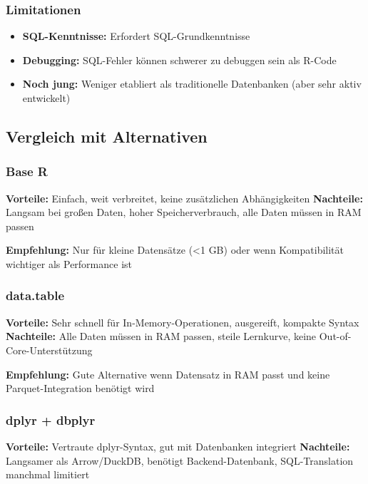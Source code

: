 \documentclass[
  ngerman,
  10pt,
  twocolumn]{article}
\providecommand{\tightlist}{%
  \setlength{\itemsep}{0pt}\setlength{\parskip}{0pt}}
\begin{document}
\subsubsection{Limitationen}\label{limitationen-1}

\begin{itemize}
\tightlist
\item
  \textbf{SQL-Kenntnisse:} Erfordert SQL-Grundkenntnisse
\item
  \textbf{Debugging:} SQL-Fehler können schwerer zu debuggen sein als
  R-Code
\item
  \textbf{Noch jung:} Weniger etabliert als traditionelle Datenbanken
  (aber sehr aktiv entwickelt)
\end{itemize}

\subsection{Vergleich mit
Alternativen}\label{vergleich-mit-alternativen}

\subsubsection{Base R}\label{base-r}

\textbf{Vorteile:} Einfach, weit verbreitet, keine zusätzlichen
Abhängigkeiten \textbf{Nachteile:} Langsam bei großen Daten, hoher
Speicherverbrauch, alle Daten müssen in RAM passen

\textbf{Empfehlung:} Nur für kleine Datensätze (\textless1 GB) oder wenn
Kompatibilität wichtiger als Performance ist

\subsubsection{data.table}\label{data.table}

\textbf{Vorteile:} Sehr schnell für In-Memory-Operationen, ausgereift,
kompakte Syntax \textbf{Nachteile:} Alle Daten müssen in RAM passen,
steile Lernkurve, keine Out-of-Core-Unterstützung

\textbf{Empfehlung:} Gute Alternative wenn Datensatz in RAM passt und
keine Parquet-Integration benötigt wird

\subsubsection{dplyr + dbplyr}\label{dplyr-dbplyr}

\textbf{Vorteile:} Vertraute dplyr-Syntax, gut mit Datenbanken
integriert \textbf{Nachteile:} Langsamer als Arrow/DuckDB, benötigt
Backend-Datenbank, SQL-Translation manchmal limitiert
\end{document}
